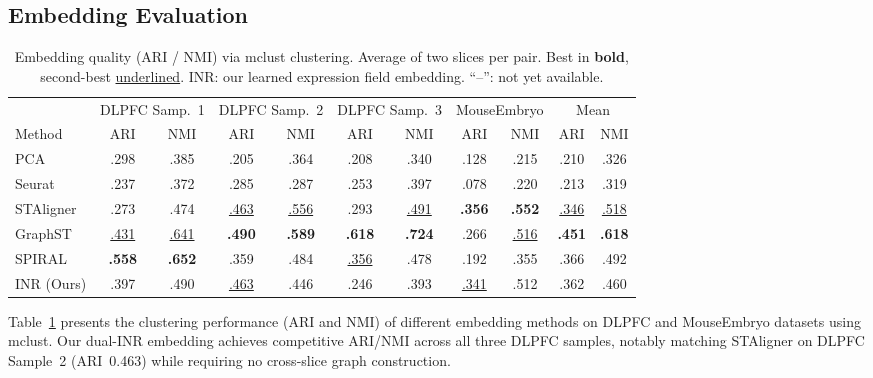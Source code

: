 \documentclass[runningheads]{llncs}
\begin{document}
\clearpage
\subsection{Embedding Evaluation}

\begin{table}[t]
\centering
\caption{Embedding quality (ARI / NMI) via mclust clustering. Average of two slices per pair. Best in \textbf{bold}, second-best \underline{underlined}. INR: our learned expression field embedding. ``--'': not yet available.}
\label{tab:embedding}
\setlength{\tabcolsep}{2.5pt}
{\fontsize{8}{9.5}\selectfont
\begin{tabular}{@{}l cc cc cc cc cc@{}}
\toprule
& \multicolumn{2}{c}{DLPFC Samp.~1} & \multicolumn{2}{c}{DLPFC Samp.~2} & \multicolumn{2}{c}{DLPFC Samp.~3} & \multicolumn{2}{c}{MouseEmbryo} & \multicolumn{2}{c}{Mean} \\
\cmidrule(lr){2-3}\cmidrule(lr){4-5}\cmidrule(lr){6-7}\cmidrule(lr){8-9}\cmidrule(lr){10-11}
Method & ARI & NMI & ARI & NMI & ARI & NMI & ARI & NMI & ARI & NMI \\
\midrule
PCA        & .298 & .385 & .205 & .364 & .208 & .340 & .128 & .215 & .210 & .326 \\
Seurat     & .237 & .372 & .285 & .287 & .253 & .397 & .078 & .220 & .213 & .319 \\
STAligner  & .273 & .474 & \underline{.463} & \underline{.556} & .293 & \underline{.491} & \textbf{.356} & \textbf{.552} & \underline{.346} & \underline{.518} \\
GraphST    & \underline{.431} & \underline{.641} & \textbf{.490} & \textbf{.589} & \textbf{.618} & \textbf{.724} & .266 & \underline{.516} & \textbf{.451} & \textbf{.618} \\
SPIRAL     & \textbf{.558} & \textbf{.652} & .359 & .484 & \underline{.356} & .478 & .192 & .355 & .366 & .492 \\
INR (Ours) & .397 & .490 & \underline{.463} & .446 & .246 & .393 & \underline{.341} & .512 & .362 & .460 \\
\bottomrule
\end{tabular}
}
\end{table}

Table~\ref{tab:embedding} presents the clustering performance (ARI and NMI) of different embedding methods on DLPFC and MouseEmbryo datasets using mclust. Our dual-INR embedding achieves competitive ARI/NMI across all three DLPFC samples, notably matching STAligner on DLPFC Sample~2 (ARI~0.463) while requiring no cross-slice graph construction.
\end{document}
